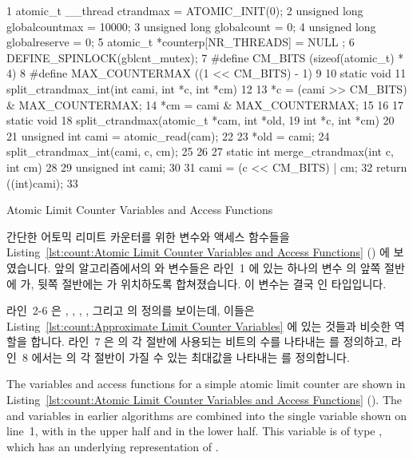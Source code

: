 \begin{listing}[tbp]
{ \scriptsize
\begin{verbbox}
  1 atomic_t __thread ctrandmax = ATOMIC_INIT(0);
  2 unsigned long globalcountmax = 10000;
  3 unsigned long globalcount = 0;
  4 unsigned long globalreserve = 0;
  5 atomic_t *counterp[NR_THREADS] = { NULL };
  6 DEFINE_SPINLOCK(gblcnt_mutex);
  7 #define CM_BITS (sizeof(atomic_t) * 4)
  8 #define MAX_COUNTERMAX ((1 << CM_BITS) - 1)
  9 
 10 static void
 11 split_ctrandmax_int(int cami, int *c, int *cm)
 12 {
 13   *c = (cami >> CM_BITS) & MAX_COUNTERMAX;
 14   *cm = cami & MAX_COUNTERMAX;
 15 }
 16 
 17 static void
 18 split_ctrandmax(atomic_t *cam, int *old,
 19                     int *c, int *cm)
 20 {
 21   unsigned int cami = atomic_read(cam);
 22 
 23   *old = cami;
 24   split_ctrandmax_int(cami, c, cm);
 25 }
 26 
 27 static int merge_ctrandmax(int c, int cm)
 28 {
 29   unsigned int cami;
 30 
 31   cami = (c << CM_BITS) | cm;
 32   return ((int)cami);
 33 }
\end{verbbox}
}
\centering
\theverbbox
\caption{Atomic Limit Counter Variables and Access Functions}
\label{lst:count:Atomic Limit Counter Variables and Access Functions}
\end{listing}

간단한 어토믹 리미트 카운터를 위한 변수와 액세스 함수들을
Listing~\ref{lst:count:Atomic Limit Counter Variables and Access Functions}
() 에 보였습니다.
앞의 알고리즘에서의  와  변수들은 라인~1 에 있는
하나의 변수  의 앞쪽 절반에  가, 뒷쪽 절반에는
 가 위치하도록 합쳐졌습니다.
이 변수는 결국  인  타입입니다.

라인~2-6 은 , , ,
, 그리고  의 정의를 보이는데, 이들은
Listing~\ref{lst:count:Approximate Limit Counter Variables} 에 있는 것들과
비슷한 역할을 합니다.
라인~7 은  의 각 절반에 사용되는 비트의 수를 나타내는
를 정의하고, 라인~8 에서는  의 각 절반이 가질 수 있는
최대값을 나타내는  를 정의합니다.
\iffalse

The variables and access functions for a simple atomic limit counter
are shown in
Listing~\ref{lst:count:Atomic Limit Counter Variables and Access Functions}
().
The  and  variables in earlier algorithms
are combined into the single variable  shown on
line~1, with  in the upper half and  in
the lower half.
This variable is of type , which has an underlying
representation of .

